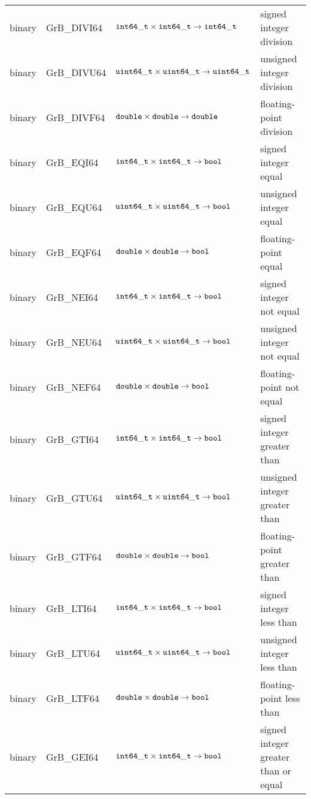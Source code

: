 \begin{table}
\begin{center}
\begin{tabular}{l|l|l|l}
binary		& {\sf GrB\_DIVI64}	& ${\tt int64\_t} \times {\tt int64\_t} \rightarrow {\tt int64\_t}$ 	& signed integer division \\
binary		& {\sf GrB\_DIVU64}	& ${\tt uint64\_t} \times {\tt uint64\_t} \rightarrow {\tt uint64\_t}$ 	& unsigned integer division \\
binary		& {\sf GrB\_DIVF64}	& ${\tt double} \times {\tt double} \rightarrow {\tt double}$ 		& floating-point division \\
binary		& {\sf GrB\_EQI64}	& ${\tt int64\_t} \times {\tt int64\_t} \rightarrow {\tt bool}$		& signed integer  equal \\
binary		& {\sf GrB\_EQU64}	& ${\tt uint64\_t} \times {\tt uint64\_t} \rightarrow {\tt bool}$ 	& unsigned integer  equal \\
binary		& {\sf GrB\_EQF64}	& ${\tt double} \times {\tt double} \rightarrow {\tt bool}$ 		& floating-point  equal \\
binary		& {\sf GrB\_NEI64}	& ${\tt int64\_t} \times {\tt int64\_t} \rightarrow {\tt bool}$		& signed integer not equal \\
binary		& {\sf GrB\_NEU64}	& ${\tt uint64\_t} \times {\tt uint64\_t} \rightarrow {\tt bool}$ 	& unsigned integer not equal \\
binary		& {\sf GrB\_NEF64}	& ${\tt double} \times {\tt double} \rightarrow {\tt bool}$ 		& floating-point not equal \\
binary		& {\sf GrB\_GTI64}	& ${\tt int64\_t} \times {\tt int64\_t} \rightarrow {\tt bool}$		& signed integer greater than  \\
binary		& {\sf GrB\_GTU64}	& ${\tt uint64\_t} \times {\tt uint64\_t} \rightarrow {\tt bool}$ 	& unsigned integer greater than  \\
binary		& {\sf GrB\_GTF64}	& ${\tt double} \times {\tt double} \rightarrow {\tt bool}$ 		& floating-point greater than  \\
binary		& {\sf GrB\_LTI64}	& ${\tt int64\_t} \times {\tt int64\_t} \rightarrow {\tt bool}$		& signed integer less than  \\
binary		& {\sf GrB\_LTU64}	& ${\tt uint64\_t} \times {\tt uint64\_t} \rightarrow {\tt bool}$ 	& unsigned integer less than  \\
binary		& {\sf GrB\_LTF64}	& ${\tt double} \times {\tt double} \rightarrow {\tt bool}$ 		& floating-point less than  \\
binary		& {\sf GrB\_GEI64}	& ${\tt int64\_t} \times {\tt int64\_t} \rightarrow {\tt bool}$		& signed integer greater than or equal \\

\end{tabular}
\end{center}
\end{table}
